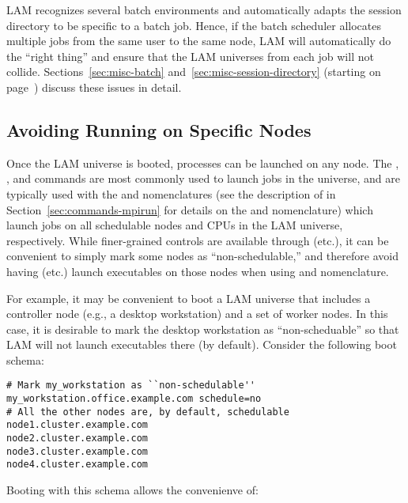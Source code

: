 LAM recognizes several batch environments and automatically adapts the
session directory to be specific to a batch job.  Hence, if the batch
scheduler allocates multiple jobs from the same user to the same node,
LAM will automatically do the ``right thing'' and ensure that the LAM
universes from each job will not collide.
%
Sections~\ref{sec:misc-batch} and~\ref{sec:misc-session-directory}
(starting on page~\pageref{sec:misc-batch}) discuss these issues in
detail.


\subsection{Avoiding Running on Specific Nodes}
\label{sec:commands-lamboot-no-schedule}

Once the LAM universe is booted, processes can be launched on any
node.  The , , and  commands are
most commonly used to launch jobs in the universe, and are typically
used with the  and  nomenclatures (see the description of
 in Section~\ref{sec:commands-mpirun} for details on the
 and  nomenclature) which launch jobs on all schedulable
nodes and CPUs in the LAM universe, respectively.  While finer-grained
controls are available through  (etc.), it can be
convenient to simply mark some nodes as ``non-schedulable,'' and
therefore avoid having  (etc.) launch executables on those
nodes when using  and  nomenclature.

For example, it may be convenient to boot a LAM universe that includes
a controller node (e.g., a desktop workstation) and a set of worker
nodes.  In this case, it is desirable to mark the desktop workstation
as ``non-scheduable'' so that LAM will not launch executables there
(by default).  Consider the following boot schema:

\lstset{style=lam-shell}
\begin{lstlisting}
# Mark my_workstation as ``non-schedulable''
my_workstation.office.example.com schedule=no
# All the other nodes are, by default, schedulable
node1.cluster.example.com
node2.cluster.example.com
node3.cluster.example.com
node4.cluster.example.com
\end{lstlisting}

Booting with this schema allows the convenienve of:

